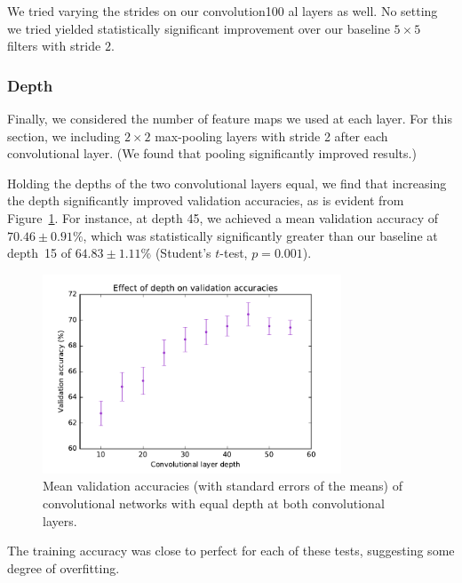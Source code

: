\documentclass{article}
\begin{document}
\begin{multicols}{2}
We tried varying the strides on our convolution100
al layers as well.
No setting we tried yielded statistically significant improvement
over our baseline $5\times 5$ filters with stride $2$.


\subsubsection{Depth}

Finally, we considered the number of feature maps
we used at each layer.
For this section,
we including $2\times 2$ max-pooling layers with stride 2
after each convolutional layer.
(We found that pooling significantly improved results.)

Holding the depths of the two convolutional layers equal,
we find that increasing the depth
significantly improved validation accuracies,
as is evident from Figure~\ref{fig:2-5-conv-depth-val-acc}.
For instance, at depth 45,
we achieved a mean validation accuracy of $70.46 \pm 0.91\%$,
which was statistically significantly greater
than our baseline at depth~15 of $64.83 \pm 1.11\%$
(Student's $t$-test, $p=0.001$).

\begin{figure}[t]
   \centering
   \includegraphics[width=3.5in]{img/2-5-conv-depth-val-acc.pdf}
   \caption{Mean validation accuracies (with standard errors of the means)
       of convolutional networks with equal depth at both convolutional layers.}
   \label{fig:2-5-conv-depth-val-acc}
\end{figure}

The training accuracy was close to perfect
for each of these tests,
suggesting some degree of overfitting.




\end{multicols}
\end{document}
